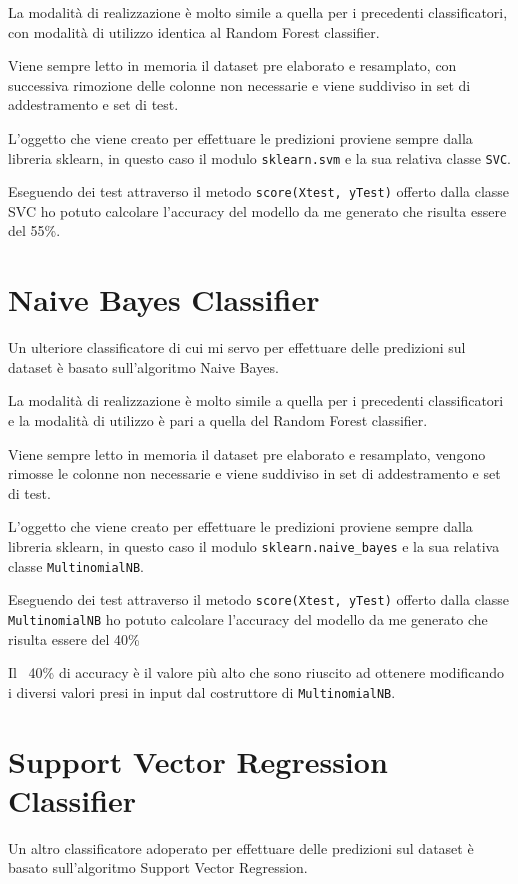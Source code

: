 La modalità di realizzazione è molto simile a quella per i precedenti classificatori, con modalità di utilizzo identica al Random Forest classifier.

Viene sempre letto in memoria il dataset pre elaborato e resamplato, con successiva rimozione delle colonne non necessarie e viene suddiviso in set di addestramento e set di test.

L’oggetto che viene creato per effettuare le predizioni proviene sempre dalla libreria sklearn, in questo caso il modulo \texttt{sklearn.svm} e la sua relativa classe \texttt{SVC}.

Eseguendo dei test attraverso il metodo \mintinline[bgcolor=bg]
{python}{score(Xtest, yTest)} offerto dalla classe SVC ho potuto calcolare l’accuracy del modello da me generato che risulta essere del 55\%.

\section{Naive Bayes Classifier}
Un ulteriore classificatore di cui mi servo per effettuare delle predizioni sul dataset è basato sull’algoritmo Naive Bayes.

La modalità di realizzazione è molto simile a quella per i precedenti classificatori e la modalità di utilizzo è pari a quella del Random Forest classifier.

Viene sempre letto in memoria il dataset pre elaborato e resamplato, vengono rimosse le colonne non necessarie e viene suddiviso in set di addestramento e set di test.

L’oggetto che viene creato per effettuare le predizioni proviene sempre dalla libreria sklearn, in questo caso il modulo \texttt{sklearn.naive_bayes} e la sua relativa classe \texttt{MultinomialNB}.

Eseguendo dei test attraverso il metodo \mintinline[bgcolor=bg]
{python}{score(Xtest, yTest)} offerto dalla classe \texttt{MultinomialNB} ho potuto calcolare l’accuracy del modello da me generato che risulta essere del 40\%

Il ~40\% di accuracy è il valore più alto che sono riuscito ad ottenere modificando i diversi valori presi in input dal costruttore di \texttt{MultinomialNB}.

\section{ Support Vector Regression Classifier}
Un altro classificatore adoperato per effettuare delle predizioni sul dataset è basato sull’algoritmo Support Vector Regression.

